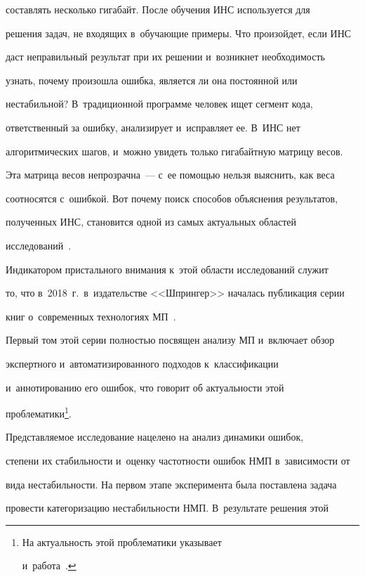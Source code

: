 составлять несколько гигабайт. После обучения ИНС используется для 


решения задач, не входящих в~обучающие примеры. Что произойдет, если ИНС 


даст неправильный результат при их решении и~возникнет необходимость 


узнать, почему произошла ошибка, является ли она постоянной или 


нестабильной? В~традиционной программе человек ищет сегмент кода, 


ответственный за ошибку, анализирует и~исправляет ее. В~ИНС нет 


алгоритмических шагов, и~можно увидеть только гигабайтную матрицу весов. 


Эта матрица весов непрозрачна~--- с~ее помощью нельзя выяснить, как веса 


соотносятся с~ошибкой. Вот почему поиск способов объяснения результатов, 


полученных ИНС, становится одной из самых актуальных областей 


исследований~\cite{7-eg}.


  


  Индикатором пристального внимания к~этой области исследований служит 


то, что в~2018~г.\ в~издательстве <<Шпрингер>> началась публикация серии 


книг о~современных технологиях МП~\cite{8-eg, 9-eg}. 


Первый том этой серии полностью посвящен анализу МП и~включает обзор 


экспертного и~автоматизированного подходов к~классификации 


и~аннотированию его ошибок, что говорит об актуальности этой 


проблематики\footnote{На актуальность этой проблематики указывает  


и~работа~\cite{10-eg}.}.


  


  Представляемое исследование нацелено на анализ динамики ошибок, 


степени их стабильности и~оценку частотности ошибок НМП в~зависимости от 


вида нестабильности. На первом этапе эксперимента была поставлена задача 


провести категоризацию нестабильности НМП. В~результате решения этой 


